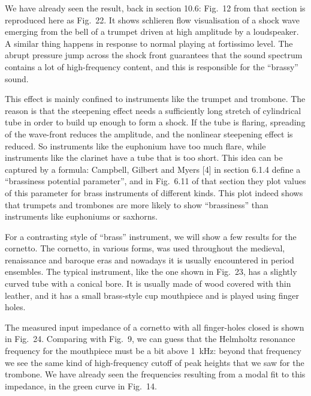   We have already seen the result, back in section 10.6: Fig.\ 12 from that 
  section is reproduced here as Fig.\ 22. It shows schlieren flow visualisation 
  of a shock wave emerging from the bell of a trumpet driven at high amplitude 
  by a loudspeaker. A similar thing happens in response to normal playing at 
  fortissimo level. The abrupt pressure jump across the shock front guarantees 
  that the sound spectrum contains a lot of high-frequency content, and this is 
  responsible for the “brassy” sound. 

  This effect is mainly confined to instruments like the trumpet and trombone. 
  The reason is that the steepening effect needs a sufficiently long stretch of 
  cylindrical tube in order to build up enough to form a shock. If the tube is 
  flaring, spreading of the wave-front reduces the amplitude, and the nonlinear 
  steepening effect is reduced. So instruments like the euphonium have too much 
  flare, while instruments like the clarinet have a tube that is too short. 
  This idea can be captured by a formula: Campbell, Gilbert and Myers [4] in 
  section 6.1.4 define a “brassiness potential parameter”, and in Fig.\ 6.11 of 
  that section they plot values of this parameter for brass instruments of 
  different kinds. This plot indeed shows that trumpets and trombones are more 
  likely to show “brassiness” than instruments like euphoniums or saxhorns. 


  For a contrasting style of “brass” instrument, we will show a few results for 
  the cornetto. The cornetto, in various forms, was used throughout the 
  medieval, renaissance and baroque eras and nowadays it is usually encountered 
  in period ensembles. The typical instrument, like the one shown in Fig.\ 23, 
  has a slightly curved tube with a conical bore. It is usually made of wood 
  covered with thin leather, and it has a small brass-style cup mouthpiece and 
  is played using finger holes. 

  The measured input impedance of a cornetto with all finger-holes closed is 
  shown in Fig.\ 24. Comparing with Fig.\ 9, we can guess that the Helmholtz 
  resonance frequency for the mouthpiece must be a bit above 1~kHz: beyond that 
  frequency we see the same kind of high-frequency cutoff of peak heights that 
  we saw for the trombone. We have already seen the frequencies resulting from 
  a modal fit to this impedance, in the green curve in Fig.\ 14. 

